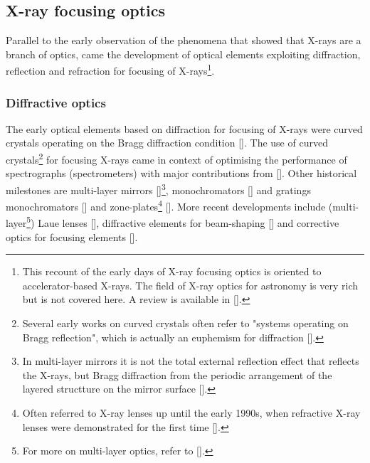 \begin{refsection}
\subsection{X-ray focusing optics}\label{sec:focusing}

Parallel to the early observation of the phenomena that showed that X-rays are a branch of optics, came the development of optical elements exploiting diffraction, reflection and refraction for focusing of X-rays\footnote{This recount of the early days of X-ray focusing optics is oriented to accelerator-based X-rays. The field of X-ray optics for astronomy is very rich but is not covered here. A review is available in [\cite{Gorenstein2010}].}.

\subsubsection*{Diffractive optics}

The early optical elements based on diffraction for focusing of X-rays were curved crystals operating on the Bragg diffraction condition [\cite{Gouy1916,Seemann1916}]. The use of curved crystals\footnote{Several early works on curved crystals often refer to "systems operating on Bragg reflection", which is actually an euphemism for diffraction [\cite{Hart1971}].} for focusing X-rays came in context of optimising the performance of spectrographs (spectrometers) with major contributions from [\cite{Johann1931,Johansson1933,V.Hamos1933, Hamos1937}]. Other historical milestones are multi-layer mirrors [\cite{Gaponov1983,Aristov1986,Underwood1986}]\footnote{In multi-layer mirrors it is not the total external reflection effect that reflects the X-rays, but Bragg diffraction from the periodic arrangement of the layered structture on the mirror surface [\cite{Morawe2010}].}, monochromators [\cite{Smith1941, DuMond1950}] and gratings monochromators [\cite{Namioka1976,McKinney1980,Tonner1980}] and zone-plates\footnote{Often referred to X-ray lenses up until the early 1990s, when refractive X-ray lenses were demonstrated for the first time [\cite{Snigirev1996}].} [\cite{Baez1960,Schmahl1969,Kirz1974}]. More recent developments include (multi-layer\footnote{For more on multi-layer optics, refer to [\cite{Aristov1988}].}) Laue lenses [\cite{Maser2004,Kang2005,Liu2005}], diffractive elements for beam-shaping [\cite{Vogt2006, Jefimovs2008, RebernikRibic2017, Rosner2017,Marchesini2019}] and corrective optics for focusing elements [\cite{Probst2020}].



\end{refsection}
